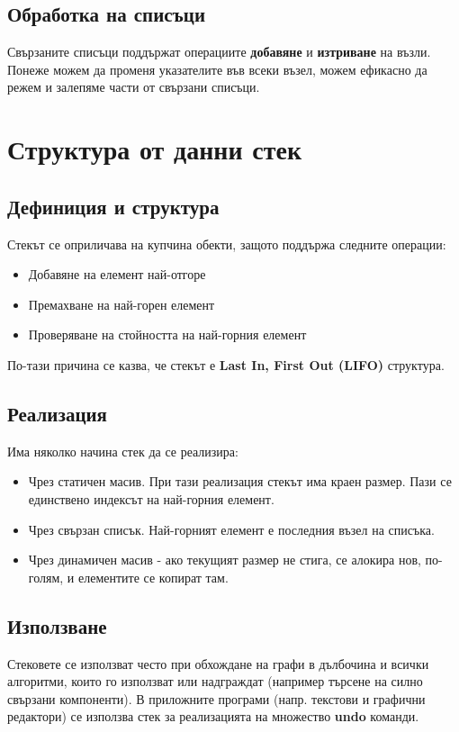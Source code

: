 \documentclass[fleqn,12pt]{article}
\begin{document}
\subsection{Обработка на списъци}
Свързаните списъци поддържат операциите \textbf{добавяне} и \textbf{изтриване} на възли.
Понеже можем да променя указателите във всеки възел, можем ефикасно да режем и залепяме части от свързани списъци. 

\section{Структура от данни стек}
\subsection{Дефиниция и структура}
Стекът се оприличава на купчина обекти, защото поддържа следните операции:
\begin{itemize}
    \item Добавяне на елемент най-отгоре
    \item Премахване на най-горен елемент
    \item Проверяване на стойността на най-горния елемент
\end{itemize}

По-тази причина се казва, че стекът е \textbf{Last In, First Out (LIFO)} структура.

\subsection{Реализация}
Има няколко начина стек да се реализира:
\begin{itemize}
    \item Чрез статичен масив. При тази реализация стекът има краен размер. Пази се единствено индексът на най-горния елемент. 
    \item Чрез свързан списък. Най-горният елемент е последния възел на списъка.
    \item Чрез динамичен масив - ако текущият размер не стига, се алокира нов, по-голям, и елементите се копират там.
\end{itemize}

\subsection{Използване}
Стековете се използват често при обхождане на графи в дълбочина и всички алгоритми, които го използват или надграждат
(например търсене на силно свързани компоненти). В приложните програми (напр. текстови и графични редактори) се използва стек за 
реализацията на множество \textbf{undo} команди.
\end{document}
